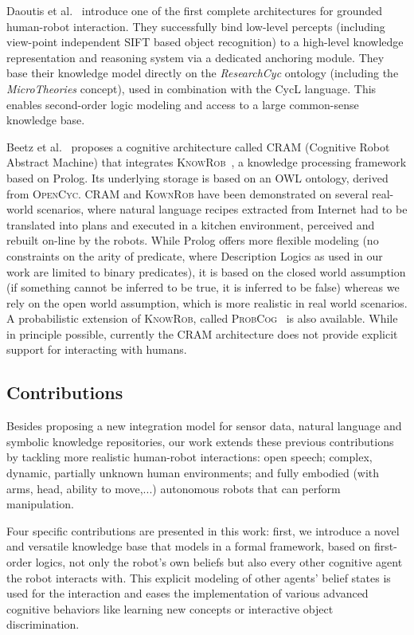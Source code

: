 \documentclass[twocolumn]{svjour3}
\begin{document}
Daoutis et al.~\cite{Daoutis2009} introduce one of the first complete
architectures for grounded human-robot interaction. They successfully bind
low-level percepts (including view-point independent SIFT based object
recognition) to a high-level knowledge representation and reasoning system via
a dedicated anchoring module. They base their knowledge model directly on the
\textit{ResearchCyc} ontology (including the \textit{MicroTheories} concept),
used in combination with the CycL language. This enables second-order
logic modeling and access to a large common-sense knowledge base.

Beetz et al.~\cite{Beetz2010} proposes a cognitive architecture called
\textsc{CRAM} (Cognitive Robot Abstract Machine) that integrates
\textsc{KnowRob}~\cite{Tenorth2009a}, a knowledge processing framework based on
Prolog. Its underlying storage is based on an OWL ontology, derived from
\textsc{OpenCyc}. \textsc{CRAM} and \textsc{KownRob} have been demonstrated on
several real-world scenarios, where natural language recipes extracted from
Internet had to be translated into plans and executed in a kitchen environment,
perceived and rebuilt on-line by the robots. While Prolog offers more flexible
modeling (no constraints on the arity of predicate, where Description Logics as
used in our work are limited to binary predicates), it is based on the closed
world assumption (if something cannot be inferred to be true, it is inferred to
be false) whereas we rely on the open world assumption, which is more realistic
in real world scenarios. A probabilistic extension of \textsc{KnowRob}, called
\textsc{ProbCog}~\cite{Jain2009} is also available. While in principle
possible, currently the CRAM architecture does not provide explicit support for
interacting with humans.


\subsection{Contributions}

Besides proposing a new integration model for sensor data, natural language and
symbolic knowledge repositories, our work extends these previous contributions
by tackling more realistic human-robot interactions: open speech; complex,
dynamic, partially unknown human environments; and fully embodied (with arms,
head, ability to move,...) autonomous robots that can perform manipulation.

Four specific contributions are presented in this work: first, we introduce a
novel and versatile knowledge base that models in a formal framework, based on
first-order logics, not only the robot's own beliefs but also every other
cognitive agent the robot interacts with.  This explicit modeling of other
agents' belief states is used for the interaction and eases the implementation
of various advanced cognitive behaviors like learning new concepts or
interactive object discrimination.
\end{document}
